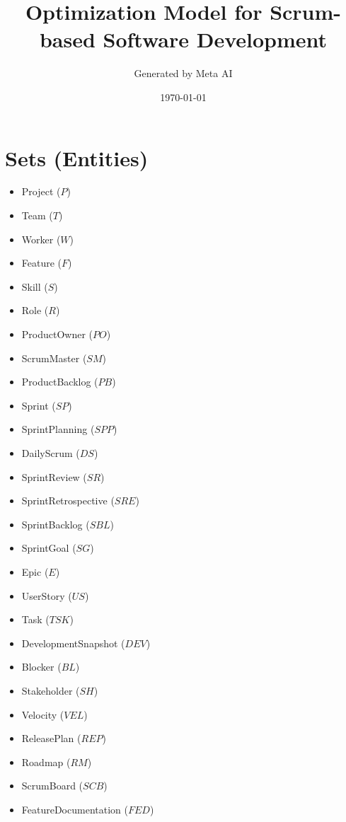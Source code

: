 \documentclass{article}
\title{Optimization Model for Scrum-based Software Development}
\author{Generated by Meta AI}
\date{\today}
\begin{document}
\maketitle
\tableofcontents

\section{Sets (Entities)}
\begin{itemize}
    \item Project ($P$)
    \item Team ($T$)
    \item Worker ($W$)
    \item Feature ($F$)
    \item Skill ($S$)
    \item Role ($R$)
    \item ProductOwner ($PO$)
    \item ScrumMaster ($SM$)
    \item ProductBacklog ($PB$)
    \item Sprint ($SP$)
    \item SprintPlanning ($SPP$)
    \item DailyScrum ($DS$)
    \item SprintReview ($SR$)
    \item SprintRetrospective ($SRE$)
    \item SprintBacklog ($SBL$)
    \item SprintGoal ($SG$)
    \item Epic ($E$)
    \item UserStory ($US$)
    \item Task ($TSK$)
    \item DevelopmentSnapshot ($DEV$)
    \item Blocker ($BL$)
    \item Stakeholder ($SH$)
    \item Velocity ($VEL$)
    \item ReleasePlan ($REP$)
    \item Roadmap ($RM$)
    \item ScrumBoard ($SCB$)
    \item FeatureDocumentation ($FED$)
\end{itemize}
\end{document}

